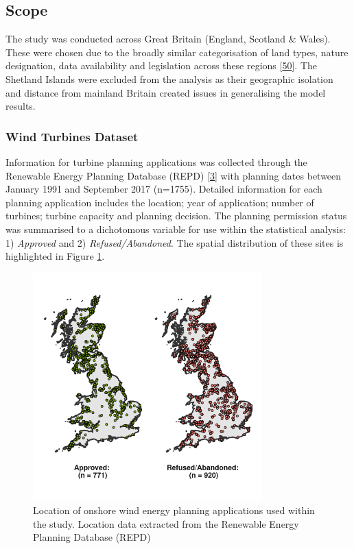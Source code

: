 \documentclass[a4paper,]{article}
\theoremstyle{definition}
\theoremstyle{definition}
\theoremstyle{definition}
\theoremstyle{remark}
\begin{document}
\subsection{Scope}\label{scope}

The study was conducted across Great Britain (England, Scotland \&
Wales). These were chosen due to the broadly similar categorisation of
land types, nature designation, data availability and legislation across
these regions {[}\protect\hyperlink{ref-HMGovernment2014}{50}{]}. The
Shetland Islands were excluded from the analysis as their geographic
isolation and distance from mainland Britain created issues in
generalising the model results.

\subsubsection{Wind Turbines Dataset}\label{wind-turbines-dataset}

Information for turbine planning applications was collected through the
Renewable Energy Planning Database (REPD)
{[}\protect\hyperlink{ref-DECC2016}{3}{]} with planning dates between
January 1991 and September 2017 (n=1755). Detailed information for each
planning application includes the location; year of application; number
of turbines; turbine capacity and planning decision. The planning
permission status was summarised to a dichotomous variable for use
within the statistical analysis: 1) \emph{Approved} and 2)
\emph{Refused/Abandoned}. The spatial distribution of these sites is
highlighted in Figure \ref{fig:StudyExtent}.

\begin{figure}[h]

{\centering \includegraphics[width=8.8cm]{Wind_Stats_Paper_files/figure-latex/StudyExtent-1} 

}

\caption{Location of onshore wind energy planning applications used within the study. Location data extracted from the Renewable Energy Planning Database (REPD)}\label{fig:StudyExtent}
\end{figure}
\end{document}
